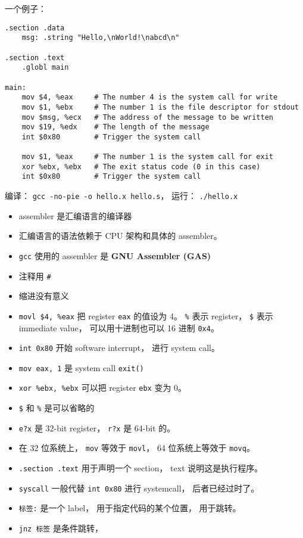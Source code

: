 
\begin{issues}
\issueDraft
\end{issues}

一个例子：
\begin{lstlisting}[language=none]
.section .data
    msg: .string "Hello,\nWorld!\nabcd\n"

.section .text
    .globl main

main:
    mov $4, %eax     # The number 4 is the system call for write
    mov $1, %ebx     # The number 1 is the file descriptor for stdout
    mov $msg, %ecx   # The address of the message to be written
    mov $19, %edx    # The length of the message
    int $0x80        # Trigger the system call

    mov $1, %eax     # The number 1 is the system call for exit
    xor %ebx, %ebx   # The exit status code (0 in this case)
    int $0x80        # Trigger the system call
\end{lstlisting}

编译： \verb|gcc -no-pie -o hello.x hello.s|， 运行： \verb|./hello.x|

\begin{itemize}
\item assembler 是汇编语言的编译器
\item 汇编语言的语法依赖于 CPU 架构和具体的 assembler。
\item \verb|gcc| 使用的 assembler 是 \textbf{GNU Assembler (GAS)}
\item 注释用 \verb|#|
\item 缩进没有意义
\item \verb|movl $4, %eax| 把 register \verb|eax| 的值设为 4。 \verb|%| 表示 register， \verb|$| 表示 immediate value， 可以用十进制也可以 16 进制 \verb|0x4|。
\item \verb|int 0x80| 开始 software interrupt， 进行 system call。
\item \verb|mov eax, 1| 是 system call \verb|exit()|
\item \verb|xor %ebx, %ebx| 可以把 register \verb|ebx| 变为 0。
\item \verb|$| 和 \verb|%| 是可以省略的
\item \verb|e?x| 是 32-bit register， \verb|r?x| 是 64-bit 的。
\item 在 32 位系统上， \verb|mov| 等效于 \verb|movl|， 64 位系统上等效于 \verb|movq|。
\item \verb|.section .text| 用于声明一个 section， text 说明这是执行程序。
\item \verb|syscall| 一般代替 \verb|int 0x80| 进行 systemcall， 后者已经过时了。
\item \verb|标签:| 是一个 label， 用于指定代码的某个位置， 用于跳转。
\item \verb|jnz 标签| 是条件跳转， 
\end{itemize}

